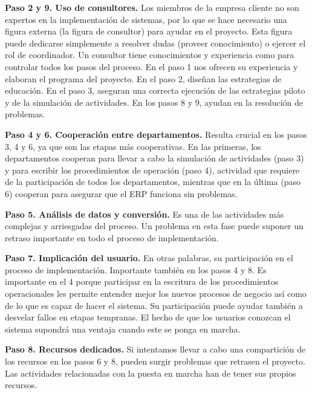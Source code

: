 \documentclass[11pt,a4paper]{article}
\begin{document}
\textbf{Paso 2 y 9. Uso de consultores.} Los miembros de la empresa cliente no son expertos en la implementación de sistemas, por lo que se hace necesario una figura externa (la figura de consultor) para ayudar en el proyecto. Esta figura puede dedicarse simplemente a resolver dudas (proveer conocimiento) o ejercer el rol de coordinador. Un consultor tiene conocimientos y experiencia como para controlar todos los pasos del proceso. En el paso 1 nos ofrecen su experiencia y elaboran el programa del proyecto. En el paso 2, diseñan las estrategias de educación. En el paso 3, aseguran una correcta ejecución de las estrategias piloto y de la simulación de actividades. En los pasos 8 y 9, ayudan en la resolución de problemas.

\textbf{Paso 4 y 6. Cooperación entre departamentos.} Resulta crucial en los pasos 3, 4 y 6, ya que son las etapas más cooperativas. En las primeras, los departamentos cooperan para llevar a cabo la simulación de actividades (paso 3) y para escribir los procedimientos de operación (paso 4), actividad que requiere de la participación de todos los departamentos, mientras que en la última (paso 6) cooperan para asegurar que el ERP funciona sin problemas.

\textbf{Paso 5. Análisis de datos y conversión.} Es una de las actividades más complejas y arriesgadas del proceso. Un problema en esta fase puede suponer un retraso importante en todo el proceso de implementación.

\textbf{Paso 7. Implicación del usuario.} En otras palabras, su participación en el proceso de implementación. Importante también en los pasos 4 y 8. Es importante en el 4 porque participar en la escritura de los procedimientos operacionales les permite entender mejor los nuevos procesos de negocio así como de lo que es capaz de hacer el sistema. Su participación puede ayudar también a desvelar fallos en etapas tempranas. El hecho de que los usuarios conozcan el sistema supondrá una ventaja cuando este se ponga en marcha. 

\textbf{Paso 8. Recursos dedicados.} Si intentamos llevar a cabo una compartición de los recursos en los pasos 6 y 8, pueden surgir problemas que retrasen el proyecto. Las actividades relacionadas con la puesta en marcha han de tener sus propios recursos.
\end{document}
